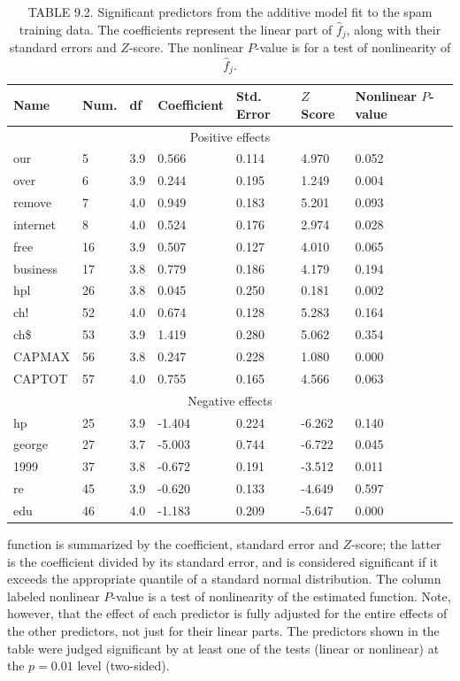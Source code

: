 \documentclass[10pt]{article}
\begin{document}
\begin{table}[h]
\begin{center}
\captionsetup{labelformat=empty}
\caption{TABLE 9.2. Significant predictors from the additive model fit to the spam training data. The coefficients represent the linear part of $\hat{f}_{j}$, along with their standard errors and $Z$-score. The nonlinear $P$-value is for a test of nonlinearity of $\hat{f}_{j}$.}
\begin{tabular}{|l|l|l|l|l|l|l|}
\hline
Name & Num. & df & Coefficient & Std. Error & $Z$ Score & Nonlinear $P$-value \\
\hline
\multicolumn{7}{|c|}{Positive effects} \\
\hline
our & 5 & 3.9 & 0.566 & 0.114 & 4.970 & 0.052 \\
\hline
over & 6 & 3.9 & 0.244 & 0.195 & 1.249 & 0.004 \\
\hline
remove & 7 & 4.0 & 0.949 & 0.183 & 5.201 & 0.093 \\
\hline
internet & 8 & 4.0 & 0.524 & 0.176 & 2.974 & 0.028 \\
\hline
free & 16 & 3.9 & 0.507 & 0.127 & 4.010 & 0.065 \\
\hline
business & 17 & 3.8 & 0.779 & 0.186 & 4.179 & 0.194 \\
\hline
hpl & 26 & 3.8 & 0.045 & 0.250 & 0.181 & 0.002 \\
\hline
ch! & 52 & 4.0 & 0.674 & 0.128 & 5.283 & 0.164 \\
\hline
ch\$ & 53 & 3.9 & 1.419 & 0.280 & 5.062 & 0.354 \\
\hline
CAPMAX & 56 & 3.8 & 0.247 & 0.228 & 1.080 & 0.000 \\
\hline
CAPTOT & 57 & 4.0 & 0.755 & 0.165 & 4.566 & 0.063 \\
\hline
\multicolumn{7}{|c|}{Negative effects} \\
\hline
hp & 25 & 3.9 & -1.404 & 0.224 & -6.262 & 0.140 \\
\hline
george & 27 & 3.7 & -5.003 & 0.744 & -6.722 & 0.045 \\
\hline
1999 & 37 & 3.8 & -0.672 & 0.191 & -3.512 & 0.011 \\
\hline
re & 45 & 3.9 & -0.620 & 0.133 & -4.649 & 0.597 \\
\hline
edu & 46 & 4.0 & -1.183 & 0.209 & -5.647 & 0.000 \\
\hline
\end{tabular}
\end{center}
\end{table}

function is summarized by the coefficient, standard error and $Z$-score; the latter is the coefficient divided by its standard error, and is considered significant if it exceeds the appropriate quantile of a standard normal distribution. The column labeled nonlinear $P$-value is a test of nonlinearity of the estimated function. Note, however, that the effect of each predictor is fully adjusted for the entire effects of the other predictors, not just for their linear parts. The predictors shown in the table were judged significant by at least one of the tests (linear or nonlinear) at the $p=0.01$ level (two-sided).
\end{document}
